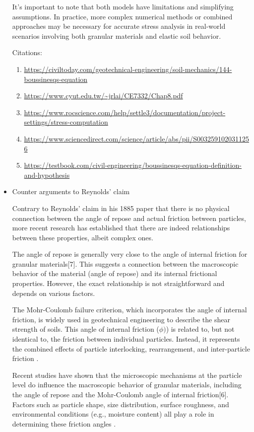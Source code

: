 \documentclass[xcolor=dvipsnames,10pt,hidelinks]{article}
\begin{document}
\begin{itemize}
It's important to note that both models have limitations and simplifying assumptions.
In practice, more complex numerical methods or combined approaches may be necessary for accurate stress analysis
in real-world scenarios involving both granular materials and elastic soil behavior.

Citations:
\begin{enumerate}
\item \url{https://civiltoday.com/geotechnical-engineering/soil-mechanics/144-boussinesqs-equation}
\item \url{https://www.cyut.edu.tw/\~jrlai/CE7332/Chap8.pdf}
\item \url{https://www.rocscience.com/help/settle3/documentation/project-settings/stress-computation}
\item \url{https://www.sciencedirect.com/science/article/abs/pii/S0032591020311256}
\item \url{https://testbook.com/civil-engineering/boussinesqs-equation-definition-and-hypothesis}
\end{enumerate}
\item Counter arguments to Reynolds' claim
\label{sec:orgc2ad976}

Contrary to Reynolds' claim in his 1885 paper that there is no physical connection between the angle of repose and actual friction between particles,
more recent research has established that there are indeed relationships between these properties, albeit complex ones.

The angle of repose is generally very close to the angle of internal friction for granular materials[7].
This suggests a connection between the macroscopic behavior of the material (angle of repose) and its internal frictional properties.
However, the exact relationship is not straightforward and depends on various factors.

The Mohr-Coulomb failure criterion, which incorporates the angle of internal friction,
is widely used in geotechnical engineering to describe the shear strength of soils.
This angle of internal friction (\(\phi)\)) is related to, but not identical to, the friction between individual particles.
Instead, it represents the combined effects of particle interlocking, rearrangement, and inter-particle friction \parencite{vanburkalow_angle_1945}.

Recent studies have shown that the microscopic mechanisms at the particle level do influence the macroscopic behavior of granular materials,
including the angle of repose and the Mohr-Coulomb angle of internal friction[6].
Factors such as particle shape, size distribution, surface roughness, and environmental conditions (e.g., moisture content) all play a role in determining these friction angles \parencite{vanburkalow_angle_1945,dong_microscopic_2022}.


\end{itemize}
\end{document}
